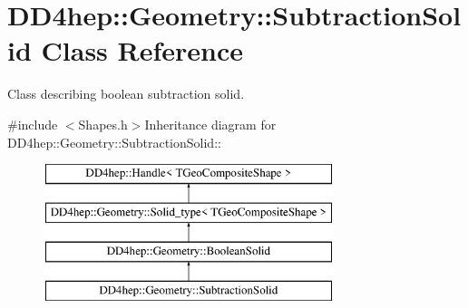 \hypertarget{class_d_d4hep_1_1_geometry_1_1_subtraction_solid}{
\section{DD4hep::Geometry::SubtractionSolid Class Reference}
\label{class_d_d4hep_1_1_geometry_1_1_subtraction_solid}
}


Class describing boolean subtraction solid.  


{\ttfamily \#include $<$Shapes.h$>$}Inheritance diagram for DD4hep::Geometry::SubtractionSolid::\begin{figure}[H]
\begin{center}
\leavevmode
\includegraphics[height=4cm]{class_d_d4hep_1_1_geometry_1_1_subtraction_solid}
\end{center}
\end{figure}
